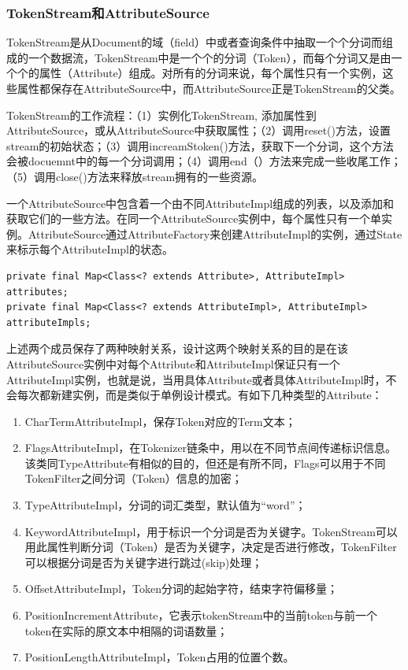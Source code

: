 \subsubsection{TokenStream和AttributeSource}
\par TokenStream是从Document的域（field）中或者查询条件中抽取一个个分词而组成的一个数据流，TokenStream中是一个个的分词（Token），而每个分词又是由一个个的属性（Attribute）组成。对所有的分词来说，每个属性只有一个实例，这些属性都保存在AttributeSource中，而AttributeSource正是TokenStream的父类。
\par TokenStream的工作流程：（1）实例化TokenStream, 添加属性到AttributeSource，或从AttributeSource中获取属性；（2）调用reset()方法，设置stream的初始状态；（3）调用increamStoken()方法，获取下一个分词，这个方法会被docuemnt中的每一个分词调用；（4）调用end（）方法来完成一些收尾工作；（5）调用close()方法来释放stream拥有的一些资源。
\par 一个AttributeSource中包含着一个由不同AttributeImpl组成的列表，以及添加和获取它们的一些方法。在同一个AttributeSource实例中，每个属性只有一个单实例。AttributeSource通过AttributeFactory来创建AttributeImpl的实例，通过State来标示每个AttributeImpl的状态。
\begin{verbatim}
private final Map<Class<? extends Attribute>, AttributeImpl> attributes;
private final Map<Class<? extends AttributeImpl>, AttributeImpl> attributeImpls;
\end{verbatim}
\par 上述两个成员保存了两种映射关系，设计这两个映射关系的目的是在该AttributeSource实例中对每个Attribute和AttributeImpl保证只有一个AttributeImpl实例，也就是说，当用具体Attribute或者具体AttributeImpl时，不会每次都新建实例，而是类似于单例设计模式。有如下几种类型的Attribute：
\begin{enumerate}[(1)]
\item CharTermAttributeImpl，保存Token对应的Term文本；
\item FlagsAttributeImpl，在Tokenizer链条中，用以在不同节点间传递标识信息。该类同TypeAttribute有相似的目的，但还是有所不同，Flags可以用于不同TokenFilter之间分词（Token）信息的加密；
\item TypeAttributeImpl，分词的词汇类型，默认值为“word”；
\item KeywordAttributeImpl，用于标识一个分词是否为关键字。TokenStream可以用此属性判断分词（Token）是否为关键字，决定是否进行修改，TokenFilter可以根据分词是否为关键字进行跳过(skip)处理；
\item OffsetAttributeImpl，Token分词的起始字符，结束字符偏移量； 
\item PositionIncrementAttribute，它表示tokenStream中的当前token与前一个token在实际的原文本中相隔的词语数量；
\item PositionLengthAttributeImpl，Token占用的位置个数。
\end{enumerate}
